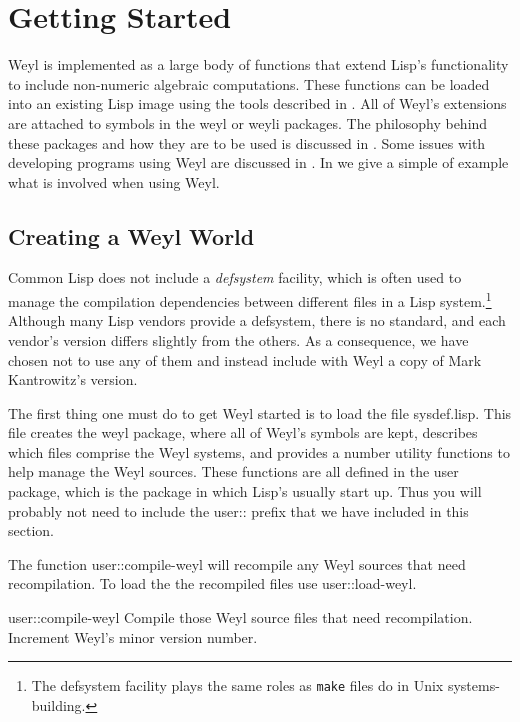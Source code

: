 \chapter{Getting Started}
\label{Starting:Chap}

Weyl is implemented as a large body of functions that extend Lisp's
functionality to include non-numeric algebraic computations.  These
functions can be loaded into an existing Lisp image using the tools
described in .  All of Weyl's extensions
are attached to symbols in the {\sf weyl} or {\sf weyli} packages.
The philosophy behind these packages and how they are to be used is
discussed in .  Some issues with developing
programs using Weyl are discussed in .  In
 we give a simple of example what is involved
when using Weyl.


\section{Creating a Weyl World}
\label{Creating:Weyl:Sec}

Common Lisp does not include a {\em defsystem} facility, which is
often used to manage the compilation dependencies between different
files in a Lisp system.\footnote{The defsystem facility plays the same
roles as {\tt make} files do in Unix systems-building.}  Although many
Lisp vendors provide a defsystem, there is no standard, and
each vendor's version differs slightly from the others.  As a
consequence, we have chosen not to use any of them and instead include
with Weyl a copy of Mark Kantrowitz's version.

The first thing one must do to get Weyl started is to load the file
{\sf sysdef.lisp}.  This file creates the {\sf weyl} package, where
all of Weyl's symbols are kept, describes which files comprise the
Weyl systems, and provides a number utility functions to help manage
the Weyl sources.  These functions are all defined in the {\sf user}
package, which is the package in which Lisp's usually start up.  Thus
you will probably not need to include the {\sf user::} prefix that we
have included in this section.

The function {\sf user::compile-weyl} will recompile any Weyl sources
that need recompilation.  To load the the recompiled files use {\sf
user::load-weyl}.  

\begin{functiondef}{user::compile-weyl}{}
Compile those Weyl source files that need recompilation.  Increment
Weyl's minor version number.
\end{functiondef}

